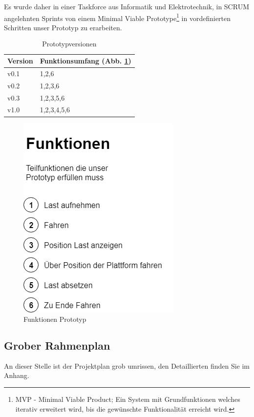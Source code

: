 \documentclass[a4paper]{report}
\begin{document}
Es wurde daher in einer Taskforce aus Informatik und Elektrotechnik, in SCRUM angelehnten Sprints von einem Minimal Viable Prototype\footnote{MVP - Minimal Viable Product; Ein System mit Grundfunktionen welches iterativ erweitert wird, bis die gewünschte Funktionalität erreicht wird.} in vordefinierten Schritten unser Prototyp zu erarbeiten.

\vspace{1em}
\noindent
\begin{table}[h]
	\centering
	\begin{tabular}{|p{}|p{}|}
		\hline
		\textbf{Version} & \textbf{Funktionsumfang (Abb. \ref{fig:PrototypePlanung})} \\
		\hline
		v0.1 & 1,2,6\\
		\hline
		v0.2 & 1,2,3,6\\
		\hline
		v0.3 & 1,2,3,5,6\\
		\hline
		v1.0 & 1,2,3,4,5,6\\
		\hline
	\end{tabular}
	\caption{Prototypversionen}
	\label{tab:PrototypePlanung}
\end{table}

\begin{figure}[h!]
	\centering
	\includegraphics[width=0.5\linewidth,keepaspectratio]{PrototypePlanung}
	\caption{Funktionen Prototyp}
	\label{fig:PrototypePlanung}
\end{figure}

\subsection{Grober Rahmenplan}
\label{ssec:GrobRahmenplan}
An dieser Stelle ist der Projektplan grob umrissen, den Detaillierten finden Sie im Anhang.
\end{document}
